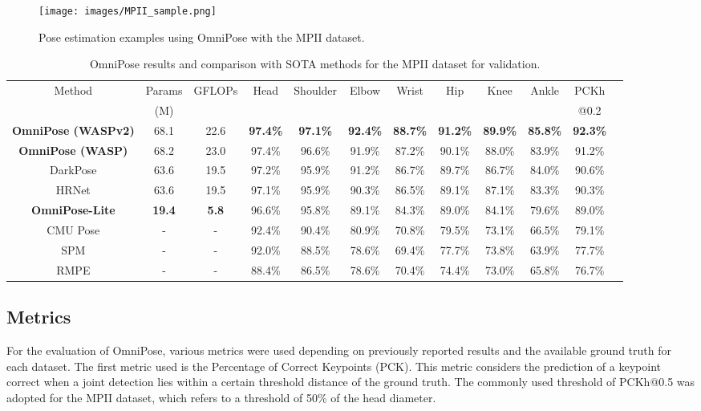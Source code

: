 \documentclass[10pt,twocolumn,letterpaper]{article}
\begin{document}
\begin{figure*}[t]
\begin{center}
\texttt{[image: images/MPII\_sample.png]}
\end{center}
  \caption{Pose estimation examples using OmniPose with the MPII dataset.}
\label{fig:MPII_sample}
\end{figure*}

\begin{table*}[!ht]
\begin{center}
\begin{tabular}{|c|c|c|c|c|c|c|c|c|c|c|c|}
\hline
\multirow{2}{*}{Method}&Params&\multirow{2}{*}{GFLOPs}&\multirow{2}{*}{Head}&\multirow{2}{*}{Shoulder}&\multirow{2}{*}{Elbow}&\multirow{2}{*}{Wrist}&\multirow{2}{*}{Hip}&\multirow{2}{*}{Knee}&\multirow{2}{*}{Ankle}&PCKh\\
&(M)&&&&&&&&&@0.2\\
\hline\hline
\textbf{OmniPose (WASPv2)}&68.1&22.6&
\textbf{97.4\%}&\textbf{97.1\%}&
\textbf{92.4\%}&\textbf{88.7\%}&
\textbf{91.2\%}&\textbf{89.9\%}&
\textbf{85.8\%}&\textbf{92.3\%}\\
\textbf{OmniPose (WASP)}&68.2&23.0&
97.4\%&96.6\%&
91.9\%&87.2\%&
90.1\%&88.0\%&
83.9\%&91.2\%\\
DarkPose \cite{DarkPose}&63.6&19.5&
97.2\%&95.9\%&
91.2\%&86.7\%&
89.7\%&86.7\%&
84.0\%&90.6\%\\
HRNet \cite{HRNet}&63.6&19.5&
97.1\%&95.9\%&
90.3\%&86.5\%&
89.1\%&87.1\%&
83.3\%&90.3\%\\
\textbf{OmniPose-Lite}&
\textbf{19.4}&
\textbf{5.8}&
96.6\%&95.8\%&
89.1\%&84.3\%&
89.0\%&84.1\%&
79.6\%&89.0\%\\
CMU Pose \cite{OpenPose}&-&-&
92.4\%&90.4\%&
80.9\%&70.8\%&
79.5\%&73.1\%&
66.5\%&79.1\%\\
SPM \cite{SPM}&-&-&
92.0\%&88.5\%&
78.6\%&69.4\%&
77.7\%&73.8\%&
63.9\%&77.7\%\\
RMPE \cite{RMPE}&-&-&
88.4\%&86.5\%&
78.6\%&70.4\%&
74.4\%&73.0\%&
65.8\%&76.7\%\\
\hline
\end{tabular}
\end{center}
\caption{OmniPose results and comparison with SOTA methods for the MPII dataset for validation.}
\label{tab:MPIIval}
\end{table*}

\subsection{Metrics}
For the evaluation of OmniPose, various metrics were used depending on previously reported results and the available ground truth for each dataset.
The first metric used is the Percentage of Correct Keypoints (PCK). This metric considers the prediction of a keypoint correct when a joint detection lies within a certain threshold distance of the ground truth. 
The commonly used threshold of PCKh@0.5 was adopted for the MPII dataset, which refers to a threshold of 50\% of the head diameter.
\end{document}

